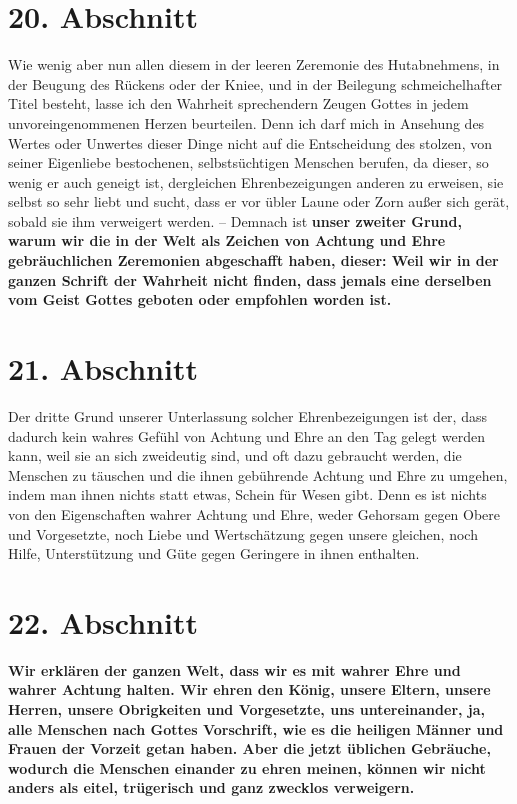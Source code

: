 \section{20. Abschnitt} \label{kap9_ab20}

Wie wenig aber nun allen diesem in der leeren Zeremonie des Hutabnehmens, in
der Beugung des Rückens oder der Kniee, und in der Beilegung schmeichelhafter
Titel besteht, lasse ich den Wahrheit sprechendern Zeugen Gottes in jedem
unvoreingenommenen Herzen beurteilen. Denn ich darf mich in Ansehung des Wertes
oder Unwertes dieser Dinge nicht auf die Entscheidung des stolzen, von seiner
Eigenliebe bestochenen, selbstsüchtigen Menschen berufen, da dieser, so wenig er
auch geneigt ist, dergleichen Ehrenbezeigungen anderen zu erweisen, sie selbst
so
sehr liebt und sucht, dass er vor übler Laune oder Zorn außer sich gerät, sobald
sie ihm verweigert werden. -- Demnach ist \label{ref:09_20_zeiter_grund}
\textbf{unser zweiter Grund, warum wir die in
der Welt als Zeichen von Achtung und Ehre gebräuchlichen Zeremonien abgeschafft
haben, dieser: Weil wir in der ganzen Schrift der Wahrheit nicht finden, dass
jemals eine derselben vom Geist Gottes geboten oder empfohlen worden ist.}

\section{21. Abschnitt} \label{kap9_ab21}

Der dritte Grund unserer Unterlassung solcher Ehrenbezeigungen ist der, dass
dadurch kein wahres Gefühl von Achtung und Ehre an den Tag gelegt werden kann,
weil sie an sich zweideutig sind, und oft dazu gebraucht werden, die Menschen zu
täuschen und die ihnen gebührende Achtung und Ehre zu umgehen, indem man ihnen
nichts statt etwas, Schein für Wesen gibt. Denn es ist nichts von den
Eigenschaften wahrer Achtung und Ehre, weder Gehorsam gegen Obere und
Vorgesetzte, noch Liebe und Wertschätzung gegen unsere gleichen, noch Hilfe,
Unterstützung und Güte gegen Geringere in ihnen enthalten.

\section{22. Abschnitt} \label{kap9_ab22}

\label{ref:09_20_koenig} \textbf{Wir erklären der ganzen Welt, dass wir
es mit wahrer Ehre und wahrer Achtung
halten. Wir ehren den König, unsere Eltern,
unsere Herren, unsere Obrigkeiten
und Vorgesetzte, uns untereinander, ja, alle
Menschen nach Gottes Vorschrift,
wie es die heiligen Männer und Frauen der Vorzeit getan haben. Aber die jetzt
üblichen Gebräuche, wodurch die Menschen einander zu ehren meinen, können wir
nicht anders als eitel, trügerisch und ganz zwecklos verweigern.}

